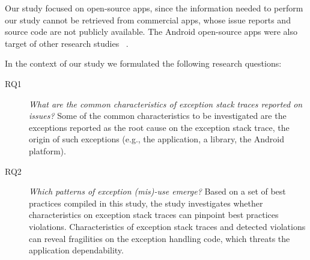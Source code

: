 \documentclass[conference]{IEEEtran}
\begin{document}
Our study focused on open-source apps, since the information needed to perform our study
cannot be retrieved from commercial apps, whose issue reports and 
source code are not publicly available. The Android open-source apps were also 
target of other research studies ~\cite{Linar13,ahimed}.   


In the context of our study we formulated the following research questions:

\begin{description}

  \item[RQ1] \noindent\emph{What are the common characteristics of exception stack traces reported on issues?} 
Some of the common characteristics to be investigated are the exceptions reported as the root cause on
the exception stack trace, the origin of such exceptions (e.g., the application, a library, the Android platform). 


  \item[RQ2] \noindent\emph{Which patterns of exception (mis)-use emerge?}
Based on a set of best practices compiled in this study, the study investigates whether characteristics on exception stack traces  
can pinpoint best practices violations. Characteristics of exception stack traces and detected violations can reveal fragilities
 on the exception handling code, which threats the application dependability. 

\end{description}

\end{document}
